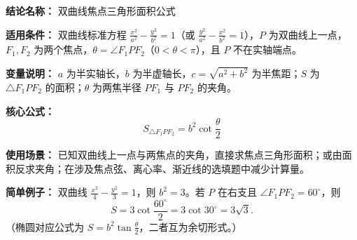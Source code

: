 \textbf{结论名称：}
双曲线焦点三角形面积公式

\textbf{适用条件：}
双曲线标准方程 \(\frac{x^2}{a^2}-\frac{y^2}{b^2}=1\)（或 \(\frac{y^2}{a^2}-\frac{x^2}{b^2}=1\)），\(P\) 为双曲线上一点，\(F_1,F_2\) 为两个焦点，\(\theta =\angle F_1PF_2\)（\(0<\theta<\pi\)），且 \(P\) 不在实轴端点。

\textbf{变量说明：}
\(a\) 为半实轴长，\(b\) 为半虚轴长，\(c=\sqrt{a^2+b^2}\) 为半焦距；\(S\) 为 \(\triangle F_1PF_2\) 的面积；\(\theta\) 为两焦半径 \(PF_1\) 与 \(PF_2\) 的夹角。

\textbf{核心公式：}
\[
\boxed{S_{\triangle F_1PF_2}=b^2\cot\frac{\theta}{2}}
\]

\textbf{使用场景：}
已知双曲线上一点与两焦点的夹角，直接求焦点三角形面积；或由面积反求夹角；在涉及焦点弦、离心率、渐近线的选填题中减少计算量。

\textbf{简单例子：}
双曲线 \(\frac{x^2}{4}-\frac{y^2}{3}=1\)，则 \(b^2=3\)。若 \(P\) 在右支且 \(\angle F_1PF_2=60^\circ\)，则
\[
S=3\cot\frac{60^\circ}{2}=3\cot30^\circ=3\sqrt{3}.
\]
（椭圆对应公式为 \(S=b^2\tan\frac{\theta}{2}\)，二者互为余切形式。）